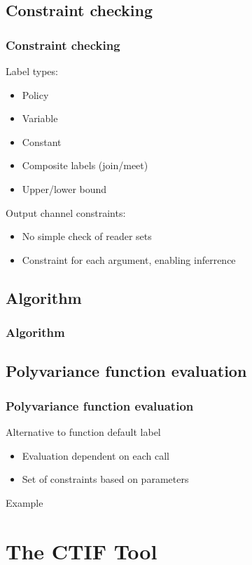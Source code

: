 \documentclass[10pt]{beamer}
\begin{document}
\subsection{Constraint checking}
\begin{frame}
  \frametitle{Constraint checking}

  Label types:
  \begin{itemize}
    \item Policy
    \item Variable
    \item Constant
    \item Composite labels (join/meet)
    \item Upper/lower bound
  \end{itemize}
  \vspace{1em}
  Output channel constraints:
  \begin{itemize}
    \item No simple check of reader sets
    \item Constraint for each argument, enabling inferrence
  \end{itemize}
\end{frame}

\subsection{Algorithm}
\begin{frame}
  \frametitle{Algorithm}
  \centering

  \scalebox{.9}{
  
  }
\end{frame}

\subsection{Polyvariance function evaluation}
\begin{frame}
  \frametitle{Polyvariance function evaluation}

  Alternative to function default label
  \begin{itemize}
    \item Evaluation dependent on each call
    \item Set of constraints based on parameters
  \end{itemize}
  \vspace{1em}
  Example
\end{frame}

\section{The CTIF Tool}
\end{document}
